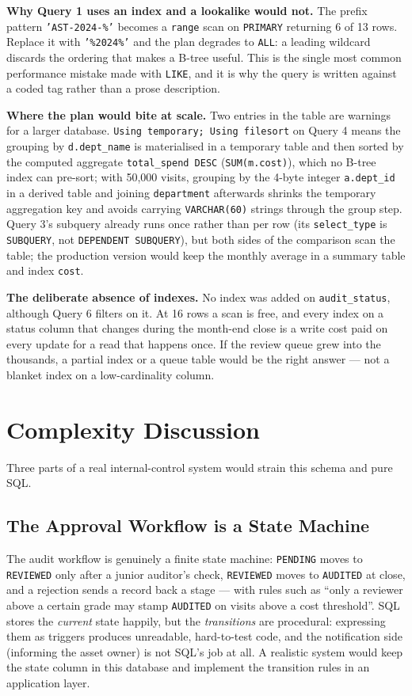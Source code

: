 \documentclass[conference]{IEEEtran}
\begin{document}
\textbf{Why Query 1 uses an index and a lookalike would not.} The prefix
pattern \texttt{'AST-2024-\%'} becomes a \texttt{range} scan on \texttt{PRIMARY}
returning 6 of 13 rows. Replace it with \texttt{'\%2024\%'} and the plan
degrades to \texttt{ALL}: a leading wildcard discards the ordering that makes
a B-tree useful. This is the single most common performance mistake made with
\texttt{LIKE}, and it is why the query is written against a coded tag rather
than a prose description.

\textbf{Where the plan would bite at scale.} Two entries in the table are
warnings for a larger database. \texttt{Using temporary; Using filesort} on
Query 4 means the grouping by \texttt{d.dept\_name} is materialised in a
temporary table and then sorted by the computed aggregate \texttt{total\_spend
DESC} (\texttt{SUM(m.cost)}), which no B-tree index can pre-sort; with 50,000
visits, grouping by the 4-byte integer \texttt{a.dept\_id} in a derived table
and joining \texttt{department} afterwards shrinks the temporary aggregation
key and avoids carrying \texttt{VARCHAR(60)} strings through the group step.
Query 3's subquery already runs once rather than per row (its
\texttt{select\_type} is \texttt{SUBQUERY}, not \texttt{DEPENDENT SUBQUERY}),
but both sides of the comparison scan the table; the production version would
keep the monthly average in a summary table and index \texttt{cost}.

\textbf{The deliberate absence of indexes.} No index was added on
\texttt{audit\_status}, although Query 6 filters on it. At 16 rows a scan is
free, and every index on a status column that changes during the month-end
close is a write cost paid on every update for a read that happens once. If
the review queue grew into the thousands, a partial index or a queue table
would be the right answer --- not a blanket index on a low-cardinality column.

\section{Complexity Discussion}\label{sec:complexity}
Three parts of a real internal-control system would strain this schema and
pure SQL.

\subsection{The Approval Workflow is a State Machine}
The audit workflow is genuinely a finite state machine: \texttt{PENDING}
moves to \texttt{REVIEWED} only after a junior auditor's check,
\texttt{REVIEWED} moves to \texttt{AUDITED} at close, and a rejection sends
a record back a stage --- with rules such as ``only a reviewer above a
certain grade may stamp \texttt{AUDITED} on visits above a cost threshold''.
SQL stores the \emph{current} state happily, but the \emph{transitions} are
procedural: expressing them as triggers produces unreadable, hard-to-test
code, and the notification side (informing the asset owner) is not SQL's
job at all. A realistic system would keep the state column in this database
and implement the transition rules in an application layer.
\end{document}
